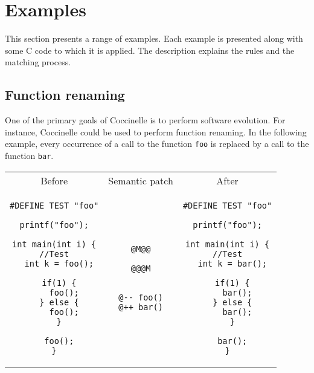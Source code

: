 
\section{Examples}

This section presents a range of examples.  Each
example is presented along with some C code to which it is
applied. The description explains the rules and the matching process.

\subsection{Function renaming}

One of the primary goals of Coccinelle is to perform software
evolution.  For instance, Coccinelle could be used to perform function
renaming. In the following example, every occurrence of a call to the
function \texttt{foo} is replaced by a call to the
function \texttt{bar}.\\

\begin{tabular}{ccc}
Before & Semantic patch & After \\
\begin{minipage}[t]{.3\linewidth}
\begin{lstlisting}
#DEFINE TEST "foo"

printf("foo");

int main(int i) {
//Test
  int k = foo();

  if(1) {
    foo();
  } else {
    foo();
  }

  foo();
}
\end{lstlisting}
\end{minipage}
&
\begin{minipage}[t]{.3\linewidth}
\begin{lstlisting}[language=Cocci]
@M@@

@@@M


@-- foo()
@++ bar()
\end{lstlisting}
\end{minipage}
&
\begin{minipage}[t]{.3\linewidth}
\begin{lstlisting}
#DEFINE TEST "foo"

printf("foo");

int main(int i) {
//Test
  int k = bar();

  if(1) {
    bar();
  } else {
    bar();
  }

  bar();
}
\end{lstlisting}
\end{minipage}\\
\end{tabular}

